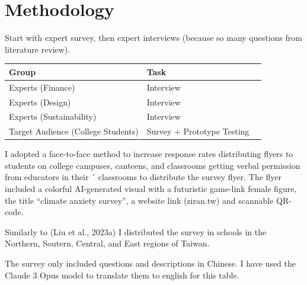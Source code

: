 \documentclass[
  letterpaper,
  DIV=11,
  numbers=noendperiod]{scrartcl}
\begin{document}
\newpage

\section{Methodology}\label{methodology}

Start with expert survey, then expert interviews (because so many
questions from literature review).

\begin{longtable}[]{@{}
  >{\raggedright\arraybackslash}p{}
  >{\raggedright\arraybackslash}p{}
  >{\raggedright\arraybackslash}p{}@{}}
\toprule\noalign{}
\begin{minipage}[b]{\linewidth}\raggedright
Group
\end{minipage} & \begin{minipage}[b]{\linewidth}\raggedright
Task
\end{minipage} & \begin{minipage}[b]{\linewidth}\raggedright
\end{minipage} \\
\midrule\noalign{}
\endhead
\bottomrule\noalign{}
\endlastfoot
Experts (Finance) & Interview & \\
Experts (Design) & Interview & \\
Experts (Sustainability) & Interview & \\
Target Audience (College Students) & Survey + Prototype Testing & \\
\end{longtable}

I adopted a face-to-face method to increase response rates distributing
flyers to students on college campuses, canteens, and classrooms getting
verbal permission from educators in their ´ classrooms to distribute the
survey flyer. The flyer included a colorful AI-generated visual with a
futuristic game-link female figure, the title ``climate anxiety
survey'', a website link (ziran.tw) and scannable QR-code.

Similarly to (Liu et al., 2023a) I distributed the survey in schools in
the Northern, Soutern, Central, and East regions of Taiwan.

The survey only included questions and descriptions in Chinese. I have
used the Claude 3 Opus model to translate them to english for this
table.
\end{document}
